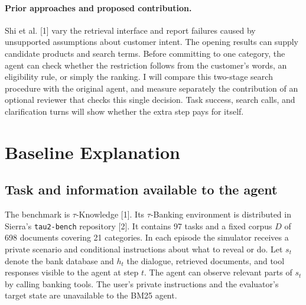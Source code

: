 \documentclass{article}
\begin{document}
\paragraph{Prior approaches and proposed contribution.} Shi et al. [1] vary the retrieval interface and report failures caused by unsupported assumptions about customer intent. The opening results can supply candidate products and search terms. Before committing to one category, the agent can check whether the restriction follows from the customer's words, an eligibility rule, or simply the ranking. I will compare this two-stage search procedure with the original agent, and measure separately the contribution of an optional reviewer that checks this single decision. Task success, search calls, and clarification turns will show whether the extra step pays for itself.

\section{Baseline Explanation}
\subsection{Task and information available to the agent}
The benchmark is $\tau$-Knowledge [1]. Its $\tau$-Banking environment is distributed in Sierra's \texttt{tau2-bench} repository [2]. It contains 97 tasks and a fixed corpus $D$ of 698 documents covering 21 categories. In each episode the simulator receives a private scenario and conditional instructions about what to reveal or do. Let $s_t$ denote the bank database and $h_t$ the dialogue, retrieved documents, and tool responses visible to the agent at step $t$. The agent can observe relevant parts of $s_t$ by calling banking tools. The user's private instructions and the evaluator's target state are unavailable to the BM25 agent.
\end{document}
